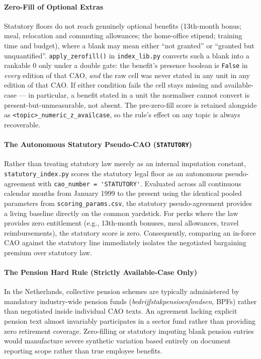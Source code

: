 \paragraph{Zero-Fill of Optional Extras}
Statutory floors do not reach genuinely optional benefits (13th-month bonus; meal, relocation and commuting allowances; the home-office stipend; training time and budget), where a blank may mean either ``not granted'' or ``granted but unquantified''. \nolinkurl{apply_zerofill()} in \nolinkurl{index_lib.py} converts such a blank into a rankable $0$ only under a double gate: the benefit's presence boolean is \texttt{False} in \emph{every} edition of that CAO, \emph{and} the raw cell was never stated in any unit in any edition of that CAO. If either condition fails the cell stays missing and available-case --- in particular, a benefit stated in a unit the normaliser cannot convert is present-but-unmeasurable, not absent. The pre-zero-fill score is retained alongside as \nolinkurl{<topic>_numeric_z_availcase}, so the rule's effect on any topic is always recoverable.

\paragraph{The Autonomous Statutory Pseudo-CAO (\texttt{STATUTORY})}
Rather than treating statutory law merely as an internal imputation constant, \nolinkurl{statutory_index.py} scores the statutory legal floor as an autonomous pseudo-agreement with \nolinkurl{cao_number = 'STATUTORY'}. Evaluated across all continuous calendar months from January 1999 to the present using the identical pooled parameters from \nolinkurl{scoring_params.csv}, the statutory pseudo-agreement provides a living baseline directly on the common yardstick. For perks where the law provides zero entitlement (e.g., 13th-month bonuses, meal allowances, travel reimbursements), the statutory score is zero. Consequently, comparing an in-force CAO against the statutory line immediately isolates the negotiated bargaining premium over statutory law.

\paragraph{The Pension Hard Rule (Strictly Available-Case Only)}
\begin{center}
\end{center}
In the Netherlands, collective pension schemes are typically administered by mandatory industry-wide pension funds (\emph{bedrijfstakpensioenfondsen}, BPFs) rather than negotiated inside individual CAO texts. An agreement lacking explicit pension text almost invariably participates in a sector fund rather than providing zero retirement coverage. Zero-filling or statutory imputing blank pension entries would manufacture severe synthetic variation based entirely on document reporting scope rather than true employee benefits.

